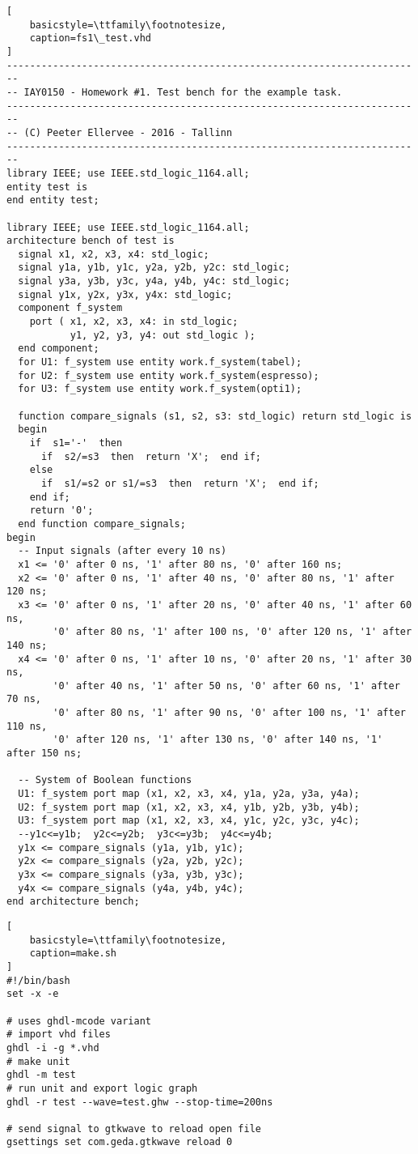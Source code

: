 \begin{lstlisting}[
    basicstyle=\ttfamily\footnotesize,
    caption=fs1\_test.vhd
]
------------------------------------------------------------------------
-- IAY0150 - Homework #1. Test bench for the example task.
------------------------------------------------------------------------
-- (C) Peeter Ellervee - 2016 - Tallinn
------------------------------------------------------------------------
library IEEE; use IEEE.std_logic_1164.all;
entity test is
end entity test;

library IEEE; use IEEE.std_logic_1164.all;
architecture bench of test is
  signal x1, x2, x3, x4: std_logic;
  signal y1a, y1b, y1c, y2a, y2b, y2c: std_logic;
  signal y3a, y3b, y3c, y4a, y4b, y4c: std_logic;
  signal y1x, y2x, y3x, y4x: std_logic;
  component f_system
    port ( x1, x2, x3, x4: in std_logic;
           y1, y2, y3, y4: out std_logic );
  end component;
  for U1: f_system use entity work.f_system(tabel);
  for U2: f_system use entity work.f_system(espresso);
  for U3: f_system use entity work.f_system(opti1);

  function compare_signals (s1, s2, s3: std_logic) return std_logic is
  begin
    if  s1='-'  then
      if  s2/=s3  then  return 'X';  end if;
    else
      if  s1/=s2 or s1/=s3  then  return 'X';  end if;
    end if;
    return '0';
  end function compare_signals;
begin
  -- Input signals (after every 10 ns)
  x1 <= '0' after 0 ns, '1' after 80 ns, '0' after 160 ns;
  x2 <= '0' after 0 ns, '1' after 40 ns, '0' after 80 ns, '1' after 120 ns;
  x3 <= '0' after 0 ns, '1' after 20 ns, '0' after 40 ns, '1' after 60 ns,
        '0' after 80 ns, '1' after 100 ns, '0' after 120 ns, '1' after 140 ns;
  x4 <= '0' after 0 ns, '1' after 10 ns, '0' after 20 ns, '1' after 30 ns,
        '0' after 40 ns, '1' after 50 ns, '0' after 60 ns, '1' after 70 ns,
        '0' after 80 ns, '1' after 90 ns, '0' after 100 ns, '1' after 110 ns,
        '0' after 120 ns, '1' after 130 ns, '0' after 140 ns, '1' after 150 ns;

  -- System of Boolean functions
  U1: f_system port map (x1, x2, x3, x4, y1a, y2a, y3a, y4a);
  U2: f_system port map (x1, x2, x3, x4, y1b, y2b, y3b, y4b);
  U3: f_system port map (x1, x2, x3, x4, y1c, y2c, y3c, y4c);
  --y1c<=y1b;  y2c<=y2b;  y3c<=y3b;  y4c<=y4b;
  y1x <= compare_signals (y1a, y1b, y1c);
  y2x <= compare_signals (y2a, y2b, y2c);
  y3x <= compare_signals (y3a, y3b, y3c);
  y4x <= compare_signals (y4a, y4b, y4c);
end architecture bench;
\end{lstlisting}


\begin{lstlisting}[
    basicstyle=\ttfamily\footnotesize,
    caption=make.sh
]
#!/bin/bash
set -x -e

# uses ghdl-mcode variant
# import vhd files
ghdl -i -g *.vhd
# make unit
ghdl -m test
# run unit and export logic graph
ghdl -r test --wave=test.ghw --stop-time=200ns

# send signal to gtkwave to reload open file
gsettings set com.geda.gtkwave reload 0
\end{lstlisting}